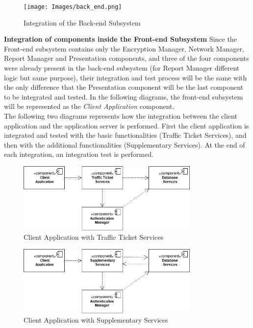          \begin{figure}[H]
             \centering
      \texttt{[image: Images/back\_end.png]}
        \caption{Integration of the Back-end Subsystem}
    \end{figure}
\vspace{2mm}
\noindent\textbf{Integration of components inside the Front-end Subsystem}\newline
Since the Front-end subsystem contains only the Encryption Manager, Network Manager, Report Manager and Presentation components, and three of the four components were already present in the back-end subsystem (for Report Manager different logic but same purpose), their integration and test process will be the same with the only difference that the Presentation component will be the last component to be integrated and tested. In the following diagrams, the front-end subsystem will be represented as the \noindent\textit{Client Application} component.\newline \\
The following two diagrams represents how the integration between the client application and the application server is performed. First the client application is integrated and tested with the basic functionalities (Traffic Ticket Services), and then with the additional functionalities (Supplementary Services). At the end of each integration, an integration test is performed.
\begin{figure}[H]
             \centering
          \includegraphics[width=0.8\textwidth]{Images/client_tt_services.png}
        \caption{Client Application with Traffic Ticket Services}
        
    \end{figure}
         \begin{figure}[H]
             \centering
          \includegraphics[width=0.8\textwidth]{Images/client_supp_services.png}
        \caption{Client Application with Supplementary Services}
    \end{figure}